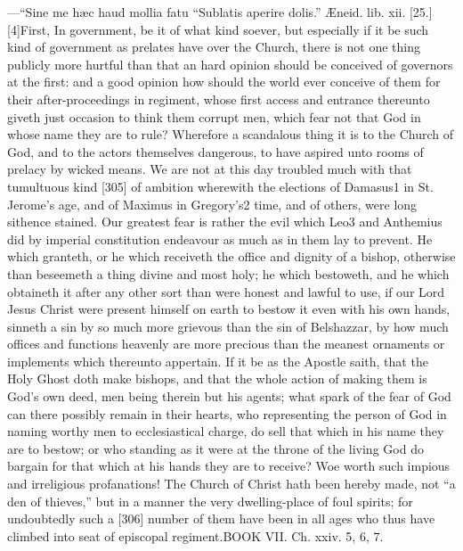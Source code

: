 —“Sine me hæc haud mollia fatu
“Sublatis aperire dolis.”
Æneid. lib. xii. [25.]
[4]First, In government, be it of what kind soever, but especially if it be such kind of government as prelates have over the Church, there is not one thing publicly more hurtful than that an hard opinion should be conceived of governors at the first: and a good opinion how should the world ever conceive of them for their after-proceedings in regiment, whose first access and entrance thereunto giveth just occasion to think them corrupt men, which fear not that God in whose name they are to rule? Wherefore a scandalous thing it is to the Church of God, and to the actors themselves dangerous, to have aspired unto rooms of prelacy by wicked means. We are not at this day troubled much with that tumultuous kind [305] of ambition wherewith the elections of Damasus1 in St. Jerome’s age, and of Maximus in Gregory’s2 time, and of others, were long sithence stained. Our greatest fear is rather the evil which Leo3 and Anthemius did by imperial constitution endeavour as much as in them lay to prevent. He which granteth, or he which receiveth the office and dignity of a bishop, otherwise than beseemeth a thing divine and most holy; he which bestoweth, and he which obtaineth it after any other sort than were honest and lawful to use, if our Lord Jesus Christ were present himself on earth to bestow it even with his own hands, sinneth a sin by so much more grievous than the sin of Belshazzar, by how much offices and functions heavenly are more precious than the meanest ornaments or implements which thereunto appertain. If it be as the Apostle saith, that the Holy Ghost doth make bishops, and that the whole action of making them is God’s own deed, men being therein but his agents; what spark of the fear of God can there possibly remain in their hearts, who representing the person of God in naming worthy men to ecclesiastical charge, do sell that which in his name they are to bestow; or who standing as it were at the throne of the living God do bargain for that which at his hands they are to receive? Woe worth such impious and irreligious profanations! The Church of Christ hath been hereby made, not “a den of thieves,” but in a manner the very dwelling-place of foul spirits; for undoubtedly such a [306] number of them have been in all ages who thus have climbed into seat of episcopal regiment.BOOK VII. Ch. xxiv. 5, 6, 7.

